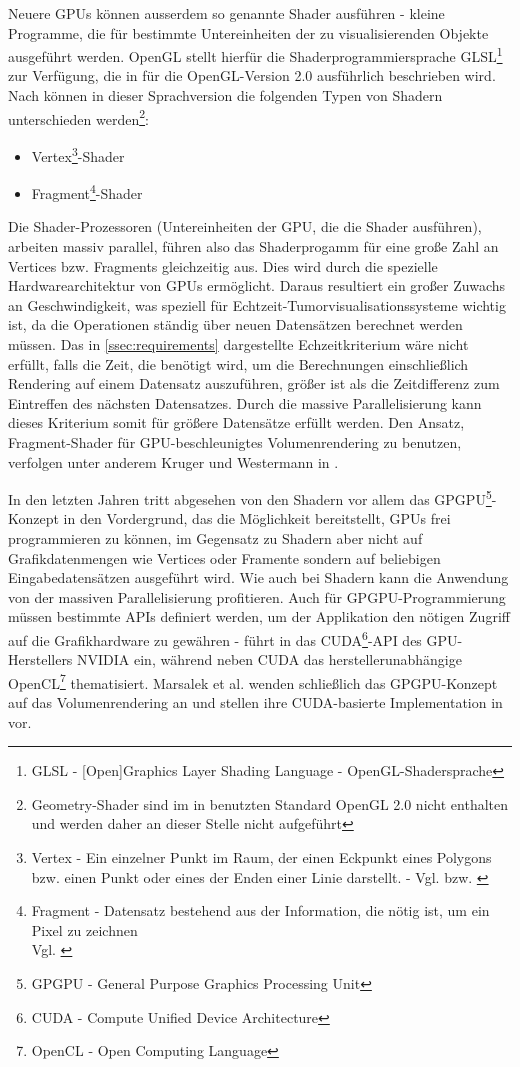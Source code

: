 \documentclass[a4paper,titlepage,12pt]{scrartcl}
\newtheorem[L]{boxedDefinition}{Definition}
\begin{document}
Neuere GPUs können ausserdem so genannte Shader ausführen - kleine Programme, die für bestimmte Untereinheiten der zu visualisierenden Objekte ausgeführt werden. OpenGL stellt hierfür die Shaderprogrammiersprache GLSL\footnote{GLSL - [Open]Graphics Layer Shading Language - OpenGL-Shadersprache} zur Verfügung, die in \cite{Rost2006} für die OpenGL-Version 2.0 ausführlich beschrieben wird. Nach \cite[Seite 38-47]{Rost2006} können in dieser Sprachversion die folgenden Typen von Shadern unterschieden werden\footnote{Geometry-Shader sind im in \cite{Rost2006} benutzten Standard OpenGL 2.0 nicht enthalten und werden daher an dieser Stelle nicht aufgeführt}:
\begin{itemize}
 \item Vertex\footnote{Vertex - Ein einzelner Punkt im Raum, der einen Eckpunkt eines Polygons bzw. einen Punkt oder eines der Enden einer Linie darstellt. - Vgl. \cite[Seite 664]{Wright2000} bzw. \cite[Seite 685]{Rost2006}}-Shader
 \item Fragment\footnote{Fragment - Datensatz bestehend aus der Information, die nötig ist, um ein Pixel zu zeichnen\\Vgl. \cite[Seite 675]{Rost2006}}-Shader
\end{itemize}
Die Shader-Prozessoren (Untereinheiten der GPU, die die Shader ausführen), arbeiten massiv parallel, führen also das Shaderprogamm für eine große Zahl an Vertices bzw. Fragments gleichzeitig aus. Dies wird durch die spezielle Hardwarearchitektur von GPUs ermöglicht. Daraus resultiert ein großer Zuwachs an Geschwindigkeit, was speziell für Echtzeit-Tumorvisualisationssysteme wichtig ist, da die Operationen ständig über neuen Datensätzen berechnet werden müssen. Das in \vref{ssec:requirements} dargestellte Echzeitkriterium wäre nicht erfüllt, falls die Zeit, die benötigt wird, um die Berechnungen einschließlich Rendering auf einem Datensatz auszuführen, größer ist als die Zeitdifferenz zum Eintreffen des nächsten Datensatzes. Durch die massive Parallelisierung kann dieses Kriterium somit für größere Datensätze erfüllt werden.
Den Ansatz, Fragment-Shader für GPU-beschleunigtes Volumenrendering zu benutzen, verfolgen unter anderem Kruger und Westermann in \cite{Kruger2003}.

In den letzten Jahren tritt abgesehen von den Shadern vor allem das GPGPU\footnote{GPGPU - General Purpose Graphics Processing Unit}-Konzept in den Vordergrund, das die Möglichkeit bereitstellt, GPUs frei programmieren zu können, im Gegensatz zu Shadern aber nicht auf Grafikdatenmengen wie Vertices oder Framente sondern auf beliebigen Eingabedatensätzen ausgeführt wird. Wie auch bei Shadern kann die Anwendung von der massiven Parallelisierung profitieren. Auch für GPGPU-Programmierung müssen bestimmte APIs definiert werden, um der Applikation den nötigen Zugriff auf die Grafikhardware zu gewähren - \cite{Sanders2010} führt in das CUDA\footnote{CUDA - Compute Unified Device Architecture}-API des GPU-Herstellers NVIDIA ein, während \cite{Kirk2010} neben CUDA das herstellerunabhängige OpenCL\footnote{OpenCL - Open Computing Language} thematisiert. Marsalek et al. wenden schließlich das GPGPU-Konzept auf das Volumenrendering an und stellen ihre CUDA-basierte Implementation in \cite{Marsalek2008} vor.
\end{document}
